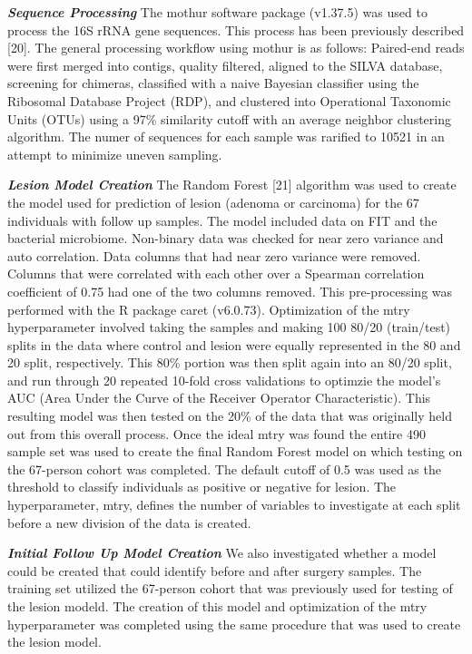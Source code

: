 \documentclass[12pt,]{article}
\begin{document}
\textbf{\emph{Sequence Processing}} The mothur software package
(v1.37.5) was used to process the 16S rRNA gene sequences. This process
has been previously described {[}20{]}. The general processing workflow
using mothur is as follows: Paired-end reads were first merged into
contigs, quality filtered, aligned to the SILVA database, screening for
chimeras, classified with a naive Bayesian classifier using the
Ribosomal Database Project (RDP), and clustered into Operational
Taxonomic Units (OTUs) using a 97\% similarity cutoff with an average
neighbor clustering algorithm. The numer of sequences for each sample
was rarified to 10521 in an attempt to minimize uneven sampling.

\textbf{\emph{Lesion Model Creation}} The Random Forest {[}21{]}
algorithm was used to create the model used for prediction of lesion
(adenoma or carcinoma) for the 67 individuals with follow up samples.
The model included data on FIT and the bacterial microbiome. Non-binary
data was checked for near zero variance and auto correlation. Data
columns that had near zero variance were removed. Columns that were
correlated with each other over a Spearman correlation coefficient of
0.75 had one of the two columns removed. This pre-processing was
performed with the R package caret (v6.0.73). Optimization of the mtry
hyperparameter involved taking the samples and making 100 80/20
(train/test) splits in the data where control and lesion were equally
represented in the 80 and 20 split, respectively. This 80\% portion was
then split again into an 80/20 split, and run through 20 repeated
10-fold cross validations to optimzie the model's AUC (Area Under the
Curve of the Receiver Operator Characteristic). This resulting model was
then tested on the 20\% of the data that was originally held out from
this overall process. Once the ideal mtry was found the entire 490
sample set was used to create the final Random Forest model on which
testing on the 67-person cohort was completed. The default cutoff of 0.5
was used as the threshold to classify individuals as positive or
negative for lesion. The hyperparameter, mtry, defines the number of
variables to investigate at each split before a new division of the data
is created.

\textbf{\emph{Initial Follow Up Model Creation}} We also investigated
whether a model could be created that could identify before and after
surgery samples. The training set utilized the 67-person cohort that was
previously used for testing of the lesion modeld. The creation of this
model and optimization of the mtry hyperparameter was completed using
the same procedure that was used to create the lesion model.
\end{document}
